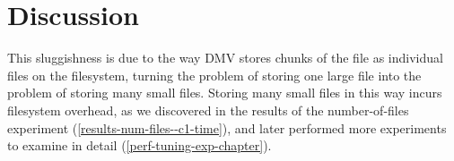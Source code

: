 \section{Discussion}




This sluggishness is due to the way DMV stores chunks of the file as individual files on the filesystem, turning the problem of storing one large file into the problem of storing many small files.
Storing many small files in this way incurs filesystem overhead, as we discovered in the results of the number-of-files experiment (\autoref{results-num-files--c1-time}), and later performed more experiments to examine in detail (\autoref{perf-tuning-exp-chapter}).
